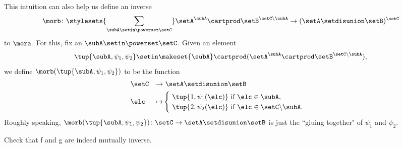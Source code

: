 This intuition can also help us define an inverse
\begin{equation}
\morb \colon \stylesets{\sum_{\subA \setin \powerset \setC}} \setA^\subA \cartprod \setB^{\setC \backslash \subA} \to (\setA \setdisunion \setB)^{\setC}   
\end{equation}
to $\mora$. For this, fix an $\subA \setin \powerset \setC$. Given an element 
\begin{equation}
\tup{\subA, \psi_1, \psi_2} \setin \makeset{\subA} \cartprod (\setA^{\subA} \cartprod \setB^{\setC \backslash \subA} ), 
\end{equation}
we define $\morb(\tup{\subA, \psi_1, \psi_2})$ to be the function
\begin{equation}
\begin{aligned}
 & \setC & \to & \ \setA \setdisunion \setB \\
 & \elc & \mapsto & \begin{cases} \  \tup{1, \psi_1(\elc)} \text{ if } \elc \in \subA, \\
          \ \tup{2, \psi_2(\elc)} \text{ if } \elc \in \setC \backslash \subA. \end{cases}
\end{aligned}
\end{equation}
Roughly speaking, $\morb(\tup{\subA, \psi_1, \psi_2}) \colon \setC \to \setA \setdisunion \setB$ is just the ``gluing together" of $\psi_1$ and $\psi_2$. 

\begin{gradedexercise}
Check that f and g are indeed mutually inverse. 
\end{gradedexercise}


